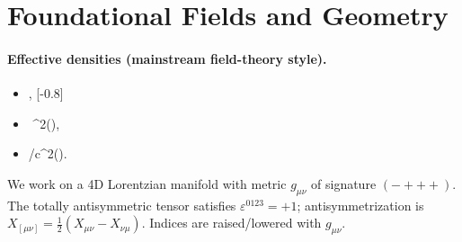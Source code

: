 \section{Foundational Fields and Geometry}
\paragraph{Effective densities (mainstream field-theory style).}
\begin{itemize}
    \item \rhoF \equiv {}, [-0.8]
    \item \rhoE \equiv {}\,\rhoF\,\vnorm^{2}\quad(),
    \item \rhoM \equiv \rhoE/c^{2}\quad().
\end{itemize}


We work on a 4D Lorentzian manifold with metric \(g_{\mu\nu}\) of signature \((-+++)\). The totally antisymmetric tensor satisfies \(\varepsilon^{0123}=+1\); antisymmetrization is \(X_{[\mu\nu]}=\tfrac12(X_{\mu\nu}-X_{\nu\mu})\). Indices are raised/lowered with \(g_{\mu\nu}\).

